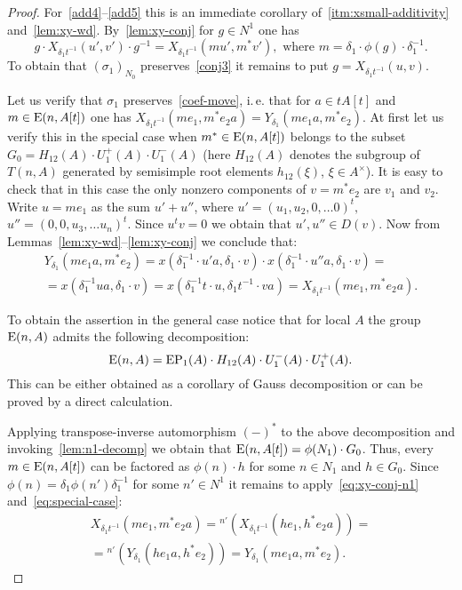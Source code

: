\begin{proof}
    For~\eqref{add4}--\eqref{add5} this is an immediate corollary of~\cref{itm:xsmall-additivity} and~\cref{lem:xy-wd}.
    By~\cref{lem:xy-conj} for $g \in N^1$ one has
    \begin{equation}
        \label{eq:xy-conj-n1}
        g \cdot X_{\delta_1 t^{-1}}(u', v') \cdot g^{-1} = X_{\delta_1 t^{-1}}(mu', m^*v'), \text{ where } m = \delta_1 \cdot \phi(g) \cdot \delta_1^{-1}.
    \end{equation}
    To obtain that $(\sigma_1)_{N_0}$ preserves~\eqref{conj3} it remains to put $g = X_{\delta_1 t^{-1}}(u, v)$.

    Let us verify that $\sigma_1$ preserves~\eqref{coef-move}, i.\,e. that for $a\in tA[t]$ and $m \in \operatorname{E}(n, A[t])$ one has
    $X_{\delta_1 t^{-1}}(me_1, m^*e_2 a) = Y_{\delta_1}(me_1 a, m^* e_2)$.
    At first let us verify this in the special case when $m^* \in \operatorname{E}(n, A[t])$ belongs to the subset $G_0 = H_{12}(A) \cdot U^+_1(A) \cdot U^-_1(A)$
    (here $H_{12}(A)$ denotes the subgroup of $T(n, A)$ generated by semisimple root elements $h_{12}(\xi)$, $\xi \in A^\times$).
    It is easy to check that in this case the only nonzero components of $v = m^* e_2$ are $v_1$ and $v_2$.
    Write $u = m e_1$ as the sum $u' + u''$, where $u' = (u_1, u_2, 0, \ldots 0)^t,$ $u'' = (0, 0, u_3, \ldots u_n)^t$.
    Since $u^t v = 0$ we obtain that $u', u'' \in D(v)$.
    Now from Lemmas~\ref{lem:xy-wd}--\ref{lem:xy-conj} we conclude that:
    \begin{multline}
        \label{eq:special-case}
        Y_{\delta_1}(me_{1}a, m^* e_2) = x(\delta_1^{-1} \cdot u'a, \delta_1\cdot  v) \cdot x(\delta_1^{-1}\cdot u''a, \delta_1 \cdot v) = \\
        = x(\delta_1^{-1} ua, \delta_1 \cdot v) = x(\delta_1^{-1}t \cdot u, \delta_{1}t^{-1} \cdot v a) = X_{\delta_1 t^{-1}}(me_1, m^*e_2 a).
    \end{multline}

    To obtain the assertion in the general case notice that for local $A$ the group $\operatorname{E}(n, A)$ admits the following decomposition:
    \[\operatorname{E}(n, A) = \mathrm{EP}_1(A) \cdot H_{12}(A) \cdot U^-_1(A) \cdot U^+_1(A).\]
    This can be either obtained as a corollary of Gauss decomposition or can be proved by a direct calculation. %

    Applying transpose-inverse automorphism $(-)^*$ to the above decomposition and invoking~\cref{lem:n1-decomp} we obtain that $\operatorname{E}(n, A[t]) = \phi(N_1) \cdot G_0$.
    Thus, every $m \in \operatorname{E}(n, A[t])$ can be factored as $\phi(n) \cdot h$ for some $n\in N_1$ and $h \in G_0$.
    Since $\phi(n) = \delta_1 \phi(n') \delta_1^{-1}$ for some $n' \in N^1$ it remains to apply~\eqref{eq:xy-conj-n1} and~\eqref{eq:special-case}:
    \begin{multline}
        \nonumber X_{\delta_1 t^{-1}}(me_1, m^*e_{2}a) = {}^{n'}(X_{\delta_1 t^{-1}}(he_1, h^*e_{2}a)) = \\
        = {}^{n'}(Y_{\delta_1}(he_{1}a, h^*e_2)) = Y_{\delta_1}(me_{1}a, m^{*} e_{2}).
    \end{multline}
\end{proof}

